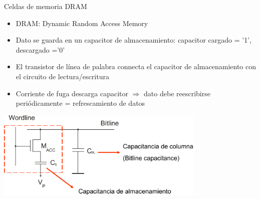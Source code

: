 \documentclass[aspectratio=169,t]{beamer}
\begin{document}
\begin{frame}{Celdas de memoria DRAM}
\begin{itemize}
	\item DRAM: Dynamic Random Access Memory
	\item Dato se guarda en un capacitor de almacenamiento: capacitor cargado = '1', descargado ='0'
	\item El transistor de línea de palabra connecta el capacitor de almacenamiento con el circuito de lectura/escritura
	\item Corriente de fuga descarga capacitor $\Rightarrow$ dato debe reescribirse periódicamente = refrescamiento de datos
\end{itemize}

\centering
\includegraphics[width=10cm]{DRAM}
\end{frame}
\end{document}
